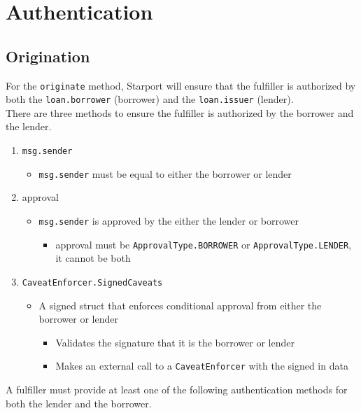 \documentclass[12pt]{article}
\begin{document}
\section{Authentication}
\subsection{Origination}
For the \texttt{originate} method, Starport will ensure that the fulfiller is authorized by both the \texttt{loan.borrower} (borrower) and the \texttt{loan.issuer} (lender).\\

There are three methods to ensure the fulfiller is authorized by the borrower and the lender.

\begin{enumerate}
	\item\texttt{msg.sender}
		\begin{itemize}
			\item\texttt{msg.sender} must be equal to either the borrower or lender
		\end{itemize}
    	
	\item approval
		\begin{itemize}
    		\item\texttt{msg.sender} is approved by the either the lender or borrower
    			\begin{itemize}
        			\item approval must be \texttt{ApprovalType.BORROWER} or \texttt{ApprovalType.LENDER}, it cannot be both
        		\end{itemize}
        \end{itemize}
	\item \texttt{CaveatEnforcer.SignedCaveats}
		\begin{itemize}
    		\item A signed struct that enforces conditional approval from either the borrower or lender
    			\begin{itemize}
        			\item Validates the signature that it is the borrower or lender
        			\item Makes an external call to a \texttt{CaveatEnforcer} with the signed in data
        		\end{itemize}
        \end{itemize}
\end{enumerate}
A fulfiller must provide at least one of the following authentication methods for both the lender and the borrower.
\end{document}
